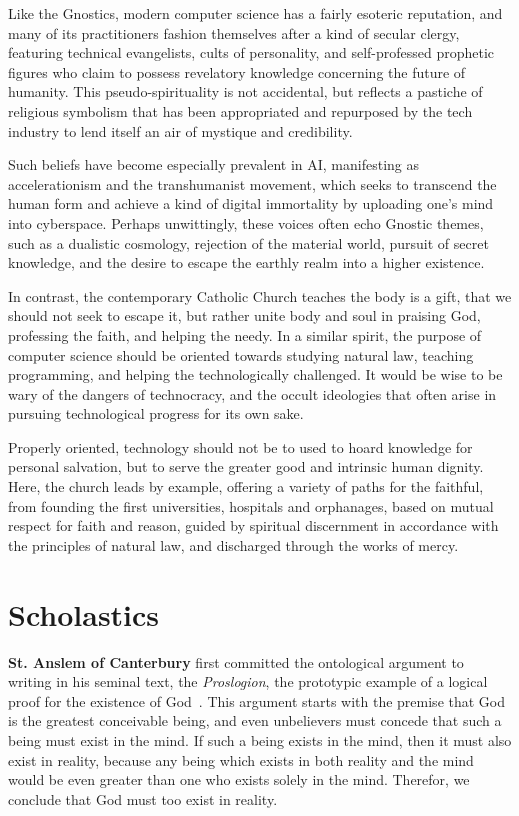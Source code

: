 \documentclass[sigplan,nonacm]{acmart}\settopmatter{printfolios=false,printccs=false,printacmref=false}
\begin{document}
  Like the Gnostics, modern computer science has a fairly esoteric reputation, and many of its practitioners fashion themselves after a kind of secular clergy, featuring technical evangelists, cults of personality, and self-professed prophetic figures who claim to possess revelatory knowledge concerning the future of humanity. This pseudo-spirituality is not accidental, but reflects a pastiche of religious symbolism that has been appropriated and repurposed by the tech industry to lend itself an air of mystique and credibility.

  Such beliefs have become especially prevalent in AI, manifesting as accelerationism and the transhumanist movement, which seeks to transcend the human form and achieve a kind of digital immortality by uploading one's mind into cyberspace. Perhaps unwittingly, these voices often echo Gnostic themes, such as a dualistic cosmology, rejection of the material world, pursuit of secret knowledge, and the desire to escape the earthly realm into a higher existence.

  In contrast, the contemporary Catholic Church teaches the body is a gift, that we should not seek to escape it, but rather unite body and soul in praising God, professing the faith, and helping the needy. In a similar spirit, the purpose of computer science should be oriented towards studying natural law, teaching programming, and helping the technologically challenged. It would be wise to be wary of the dangers of technocracy, and the occult ideologies that often arise in pursuing technological progress for its own sake.

  Properly oriented, technology should not be to used to hoard knowledge for personal salvation, but to serve the greater good and intrinsic human dignity. Here, the church leads by example, offering a variety of paths for the faithful, from founding the first universities, hospitals and orphanages, based on mutual respect for faith and reason, guided by spiritual discernment in accordance with the principles of natural law, and discharged through the works of mercy.

  \section{Scholastics}

  \textbf{St. Anslem of Canterbury} first committed the ontological argument to writing in his seminal text, the \textit{Proslogion}, the prototypic example of a logical proof for the existence of God~\cite{anslem1078fides}. This argument starts with the premise that God is the greatest conceivable being, and even unbelievers must concede that such a being must exist in the mind. If such a being exists in the mind, then it must also exist in reality, because any being which exists in both reality and the mind would be even greater than one who exists solely in the mind. Therefor, we conclude that God must too exist in reality.
\end{document}
